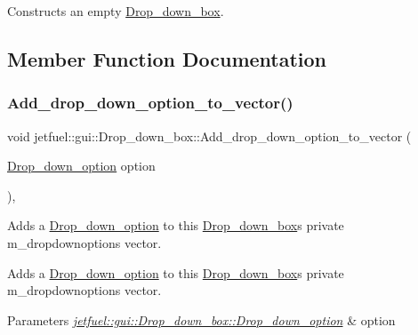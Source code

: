 Constructs an empty \hyperlink{classjetfuel_1_1gui_1_1Drop__down__box}{Drop\+\_\+down\+\_\+box}. 

\subsection{Member Function Documentation}
\mbox{\label{classjetfuel_1_1gui_1_1Drop__down__box_a7b1288e66e0276829df981a4c7a07081}} 
\subsubsection{\texorpdfstring{Add\+\_\+drop\+\_\+down\+\_\+option\+\_\+to\+\_\+vector()}{Add\_drop\_down\_option\_to\_vector()}}
{\footnotesize\ttfamily void jetfuel\+::gui\+::\+Drop\+\_\+down\+\_\+box\+::\+Add\+\_\+drop\+\_\+down\+\_\+option\+\_\+to\+\_\+vector (\begin{DoxyParamCaption}\item[{\hyperlink{structjetfuel_1_1gui_1_1Drop__down__box_1_1Drop__down__option}{Drop\+\_\+down\+\_\+option}}]{option }\end{DoxyParamCaption})\hspace{0.3cm}{\ttfamily [inline]}, {\ttfamily [protected]}}



Adds a \hyperlink{structjetfuel_1_1gui_1_1Drop__down__box_1_1Drop__down__option}{Drop\+\_\+down\+\_\+option} to this \hyperlink{classjetfuel_1_1gui_1_1Drop__down__box}{Drop\+\_\+down\+\_\+box}\textquotesingle{}s private m\+\_\+dropdownoptions vector. 

Adds a \hyperlink{structjetfuel_1_1gui_1_1Drop__down__box_1_1Drop__down__option}{Drop\+\_\+down\+\_\+option} to this \hyperlink{classjetfuel_1_1gui_1_1Drop__down__box}{Drop\+\_\+down\+\_\+box}\textquotesingle{}s private m\+\_\+dropdownoptions vector.


\begin{DoxyParams}{Parameters}
{\em \hyperlink{structjetfuel_1_1gui_1_1Drop__down__box_1_1Drop__down__option}{jetfuel\+::gui\+::\+Drop\+\_\+down\+\_\+box\+::\+Drop\+\_\+down\+\_\+option}} & option \\
\hline
\end{DoxyParams}
\mbox{\label{classjetfuel_1_1gui_1_1Drop__down__box_a2dd70d6c3982232965ecc9b7079b6144}} 
